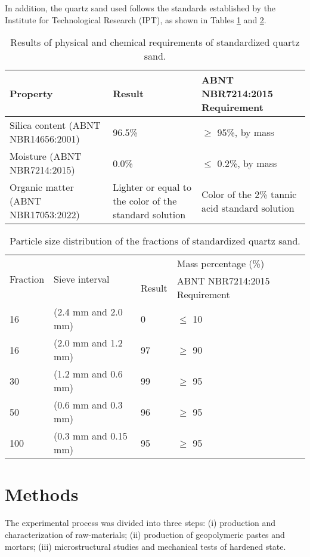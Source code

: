 In addition, the quartz sand used follows the standards established by the Institute for Technological Research (IPT), as shown in Tables \ref{tab:quartz_sand_properties} and \ref{tab:quartz_sand_granulometry}.

\begin{table}[H]
    \caption{Results of physical and chemical requirements of standardized quartz sand.}
    \label{tab:quartz_sand_properties}
    \center
    \begin{tabular}{p{} p{} p{}}
        \hline
        Property & Result & ABNT NBR7214:2015 Requirement\\
        \hline
        Silica content (ABNT NBR14656:2001) & 96.5\% & $\geq$ 95\%, by mass \\
        Moisture (ABNT NBR7214:2015) & 0.0\% & $\leq$ 0.2\%, by mass \\
        Organic matter (ABNT NBR17053:2022) & Lighter or equal to the color of the standard solution & Color of the 2\% tannic acid standard solution \\
        \hline
    \end{tabular}
\end{table}

\begin{table}[H]
    \caption{Particle size distribution of the fractions of standardized quartz sand.}
    \label{tab:quartz_sand_granulometry}
    \centering
    \begin{tabular}{p{} p{} p{} p{}}
        \hline
        \multirow{2}{*}{Fraction} & \multirow{2}{*}{Sieve interval} & \multicolumn{2}{c}{Mass percentage (\%)} \\ \cline{3-4}       
        & & Result & ABNT NBR7214:2015 Requirement\\
        \hline
        16 & (2.4 mm and 2.0 mm) & 0 & $\leq$ 10 \\
        16 & (2.0 mm and 1.2 mm) & 97 & $\geq$ 90 \\
        30 & (1.2 mm and 0.6 mm) & 99 & $\geq$ 95 \\
        50 & (0.6 mm and 0.3 mm) & 96 & $\geq$ 95 \\
        100 & (0.3 mm and 0.15 mm) & 95 & $\geq$ 95 \\
        \hline
    \end{tabular}
\end{table}

\section{Methods}
\label{sec:methods}
The experimental process was divided into three steps: (i) production and characterization of raw-materials; (ii) production of geopolymeric pastes and mortars; (iii) microstructural studies and mechanical tests of hardened state.

